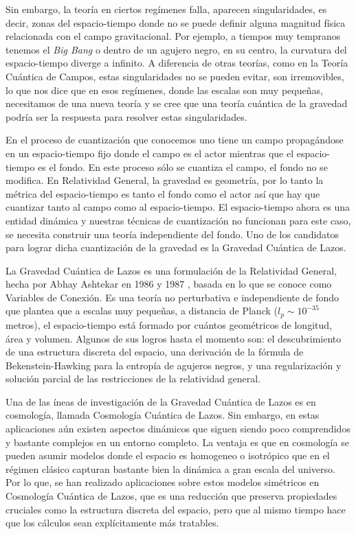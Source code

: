 \documentclass[11pt, letterpaper, spanish]{book}
\theoremstyle{definition}
\theoremstyle{plain}
\theoremstyle{remark}
\theoremstyle{break}
\begin{document}
Sin embargo, la teor\'{i}a en ciertos reg\'{i}menes falla, aparecen singularidades, es decir, zonas del espacio-tiempo donde no se puede definir alguna magnitud f\'{i}sica relacionada con el campo gravitacional. Por ejemplo, a tiempos muy tempranos tenemos el \emph{Big Bang} o dentro de un agujero negro, en su centro, la curvatura del espacio-tiempo diverge a infinito. A diferencia de otras teor\'{i}as, como en la Teor\'{i}a Cu\'{a}ntica de Campos, estas singularidades no se pueden evitar, son irremovibles, lo que nos dice que en esos reg\'{i}menes, donde las escalas son muy peque\~{n}as, necesitamos de una nueva teor\'{i}a y se cree que una teor\'{i}a cu\'{a}ntica de la gravedad podr\'{i}a ser la respuesta para resolver estas singularidades.

En el proceso de cuantizaci\'{o}n que conocemos uno tiene un campo propag\'{a}ndose en un espacio-tiempo fijo donde el campo es el actor mientras que el espacio-tiempo es el fondo. En este proceso s\'{o}lo se cuantiza el campo, el fondo no se modifica. En Relatividad General, la gravedad es geometr\'{i}a, por lo tanto la m\'{e}trica del espacio-tiempo es tanto el fondo como el actor as\'{i} que hay que cuantizar tanto al campo como al espacio-tiempo. El espacio-tiempo ahora es una entidad din\'{a}mica y nuestras t\'{e}cnicas de cuantizaci\'{o}n no funcionan para este caso, se necesita construir una teor\'{i}a independiente del fondo. Uno de los candidatos para lograr dicha cuantizaci\'{o}n de la gravedad es la Gravedad Cu\'{a}ntica de Lazos.

La Gravedad Cu\'{a}ntica de Lazos es una formulaci\'{o}n de la Relatividad General, hecha por Abhay Ashtekar en 1986 y 1987 \cite{Ashtekar86, Ashtekar87}, basada en lo que se conoce como Variables de Conexi\'{o}n. Es una teor\'{i}a no perturbativa e independiente de fondo que plantea que a escalas muy peque\~{n}as, a distancia de Planck ($l_{p} \sim 10^{-35}$ metros), el espacio-tiempo est\'{a} formado por cu\'{a}ntos geom\'{e}tricos de longitud, \'{a}rea y volumen. Algunos de sus logros hasta el momento son: el descubrimiento de una estructura discreta del espacio, una derivaci\'{o}n de la f\'{o}rmula de Bekenstein-Hawking para la entrop\'{i}a de agujeros negros, y una regularizaci\'{o}n y soluci\'{o}n parcial de las restricciones de la relatividad general. 

Una de las \'{i}neas de investigaci\'{o}n de la Gravedad Cu\'{a}ntica de Lazos es en cosmolog\'{i}a, llamada Cosmolog\'{i}a Cu\'{a}ntica de Lazos. Sin embargo, en estas aplicaciones a\'{u}n existen aspectos din\'{a}micos que siguen siendo poco comprendidos y bastante complejos en un entorno completo. La ventaja es que en cosmolog\'{i}a se pueden asumir modelos donde el espacio es homogeneo o isotr\'{o}pico que en el r\'{e}gimen cl\'{a}sico capturan bastante bien la din\'{a}mica a gran escala del universo. Por lo que, se han realizado aplicaciones sobre estos modelos sim\'{e}tricos en Cosmolog\'{i}a Cu\'{a}ntica de Lazos, que es una reducci\'{o}n que preserva propiedades cruciales como la estructura discreta del espacio, pero que al mismo tiempo hace que los c\'{a}lculos sean expl\'{i}citamente m\'{a}s tratables.
\end{document}

